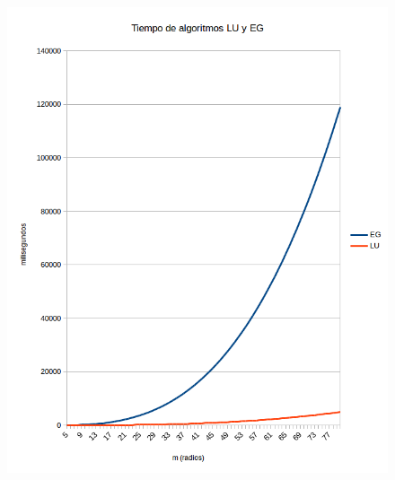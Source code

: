 \begin{figure}[h]
  \center
  \includegraphics[scale=0.8]{imagenes/tiempoLUyEGsinDividir.png}
  \label{fig:luyeg}
\end{figure}

